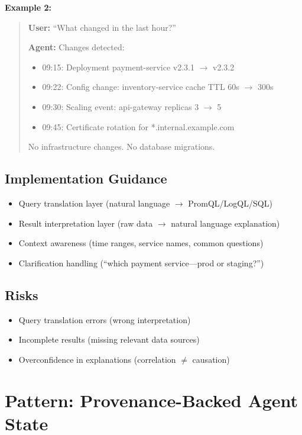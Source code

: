 \textbf{Example 2:}
\begin{quote}
\textbf{User:} ``What changed in the last hour?''

\textbf{Agent:} Changes detected:
\begin{itemize}
    \item 09:15: Deployment payment-service v2.3.1 $\rightarrow$ v2.3.2
    \item 09:22: Config change: inventory-service cache TTL 60s $\rightarrow$ 300s
    \item 09:30: Scaling event: api-gateway replicas 3 $\rightarrow$ 5
    \item 09:45: Certificate rotation for *.internal.example.com
\end{itemize}

No infrastructure changes. No database migrations.
\end{quote}

\subsection{Implementation Guidance}

\begin{itemize}
    \item Query translation layer (natural language $\rightarrow$ PromQL/LogQL/SQL)
    \item Result interpretation layer (raw data $\rightarrow$ natural language explanation)
    \item Context awareness (time ranges, service names, common questions)
    \item Clarification handling (``which payment service---prod or staging?'')
\end{itemize}

\subsection{Risks}

\begin{itemize}
    \item Query translation errors (wrong interpretation)
    \item Incomplete results (missing relevant data sources)
    \item Overconfidence in explanations (correlation $\neq$ causation)
\end{itemize}

\section{Pattern: Provenance-Backed Agent State}
\label{sec:provenance-state}

